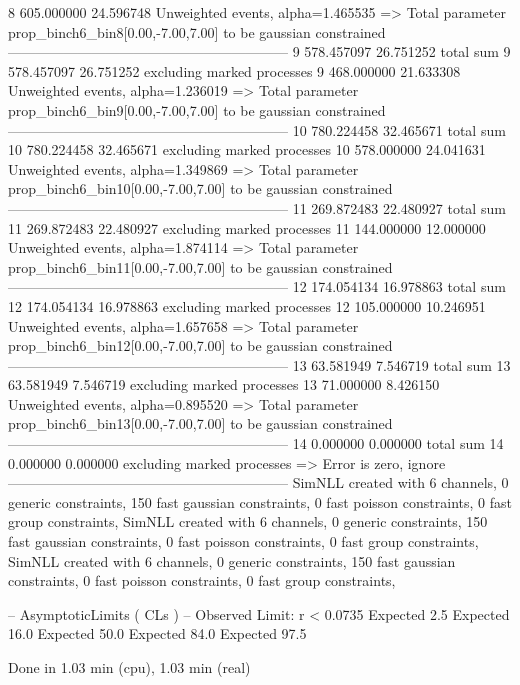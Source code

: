8          605.000000      24.596748       Unweighted events, alpha=1.465535
  => Total parameter prop_binch6_bin8[0.00,-7.00,7.00] to be gaussian constrained
------------------------------------------------------------
9          578.457097      26.751252       total sum                     
9          578.457097      26.751252       excluding marked processes    
9          468.000000      21.633308       Unweighted events, alpha=1.236019
  => Total parameter prop_binch6_bin9[0.00,-7.00,7.00] to be gaussian constrained
------------------------------------------------------------
10         780.224458      32.465671       total sum                     
10         780.224458      32.465671       excluding marked processes    
10         578.000000      24.041631       Unweighted events, alpha=1.349869
  => Total parameter prop_binch6_bin10[0.00,-7.00,7.00] to be gaussian constrained
------------------------------------------------------------
11         269.872483      22.480927       total sum                     
11         269.872483      22.480927       excluding marked processes    
11         144.000000      12.000000       Unweighted events, alpha=1.874114
  => Total parameter prop_binch6_bin11[0.00,-7.00,7.00] to be gaussian constrained
------------------------------------------------------------
12         174.054134      16.978863       total sum                     
12         174.054134      16.978863       excluding marked processes    
12         105.000000      10.246951       Unweighted events, alpha=1.657658
  => Total parameter prop_binch6_bin12[0.00,-7.00,7.00] to be gaussian constrained
------------------------------------------------------------
13         63.581949       7.546719        total sum                     
13         63.581949       7.546719        excluding marked processes    
13         71.000000       8.426150        Unweighted events, alpha=0.895520
  => Total parameter prop_binch6_bin13[0.00,-7.00,7.00] to be gaussian constrained
------------------------------------------------------------
14         0.000000        0.000000        total sum                     
14         0.000000        0.000000        excluding marked processes    
  => Error is zero, ignore      
------------------------------------------------------------
SimNLL created with 6 channels, 0 generic constraints, 150 fast gaussian constraints, 0 fast poisson constraints, 0 fast group constraints, 
SimNLL created with 6 channels, 0 generic constraints, 150 fast gaussian constraints, 0 fast poisson constraints, 0 fast group constraints, 
SimNLL created with 6 channels, 0 generic constraints, 150 fast gaussian constraints, 0 fast poisson constraints, 0 fast group constraints, 

 -- AsymptoticLimits ( CLs ) --
Observed Limit: r < 0.0735
Expected  2.5%
Expected 16.0%
Expected 50.0%
Expected 84.0%
Expected 97.5%

Done in 1.03 min (cpu), 1.03 min (real)
